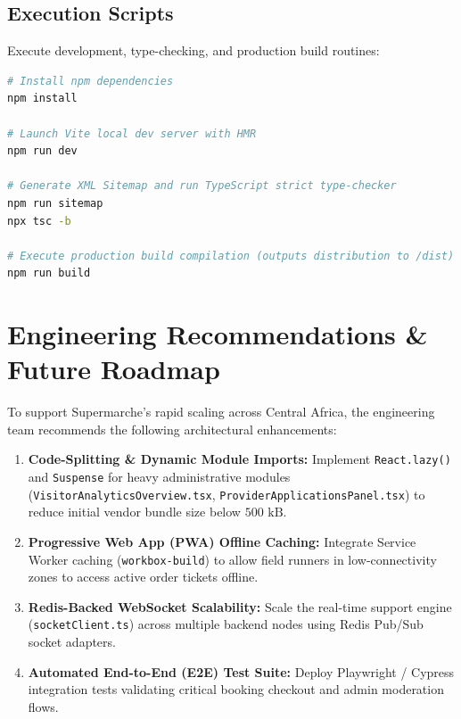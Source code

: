 \documentclass[11pt,a4paper]{article}
\begin{document}
\subsection{Execution Scripts}
Execute development, type-checking, and production build routines:

\begin{lstlisting}[language=bash, caption={Development and Build Commands}]
# Install npm dependencies
npm install

# Launch Vite local dev server with HMR
npm run dev

# Generate XML Sitemap and run TypeScript strict type-checker
npm run sitemap
npx tsc -b

# Execute production build compilation (outputs distribution to /dist)
npm run build
\end{lstlisting}

\newpage

\section{Engineering Recommendations \& Future Roadmap}

To support Supermarche's rapid scaling across Central Africa, the engineering team recommends the following architectural enhancements:

\begin{enumerate}
    \item \textbf{Code-Splitting \& Dynamic Module Imports:} Implement \texttt{React.lazy()} and \texttt{Suspense} for heavy administrative modules (\texttt{VisitorAnalyticsOverview.tsx}, \texttt{ProviderApplicationsPanel.tsx}) to reduce initial vendor bundle size below $500\text{ kB}$.
    \item \textbf{Progressive Web App (PWA) Offline Caching:} Integrate Service Worker caching (\texttt{workbox-build}) to allow field runners in low-connectivity zones to access active order tickets offline.
    \item \textbf{Redis-Backed WebSocket Scalability:} Scale the real-time support engine (\texttt{socketClient.ts}) across multiple backend nodes using Redis Pub/Sub socket adapters.
    \item \textbf{Automated End-to-End (E2E) Test Suite:} Deploy Playwright / Cypress integration tests validating critical booking checkout and admin moderation flows.
\end{enumerate}
\end{document}
